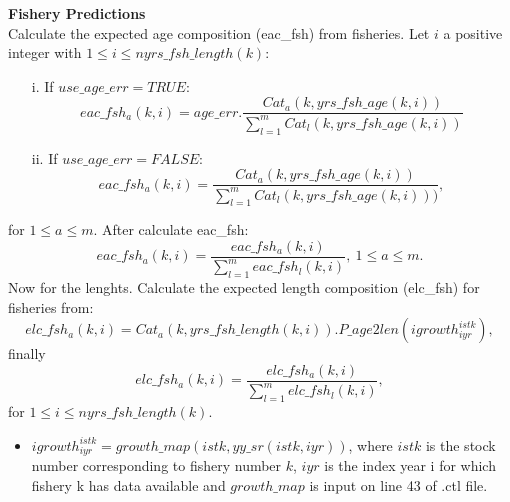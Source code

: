 \documentclass{article}
\begin{document}
\textbf{Fishery Predictions}\\
Calculate the expected age composition (eac\_fsh) from fisheries. Let $i$ a positive integer with $1\leq i \leq nyrs\_fsh\_length(k)$:
\begin{itemize}
\item [i.] If $use\_age\_err=TRUE$:
    \begin{equation}
    eac\_fsh_a(k,i)=age\_err.\dfrac{Cat_a(k,yrs\_fsh\_age(k,i))}{\displaystyle\sum_{l=1}^mCat_l(k,yrs\_fsh\_age(k,i))}
\end{equation}
\item [ii.] If $use\_age\_err=FALSE$:
\begin{equation}
    eac\_fsh_a(k,i)=\dfrac{Cat_a(k,yrs\_fsh\_age(k,i))}{\displaystyle\sum_{l=1}^mCat_l(k,yrs\_fsh\_age(k,i)))},
\end{equation}
\end{itemize}
for $1\leq a \leq m$.
After calculate eac\_fsh:
\begin{equation}
    eac\_fsh_a(k,i)=\dfrac{eac\_fsh_a(k,i)}{\displaystyle\sum_{l=1}^meac\_fsh_l(k,i)}, \ 1\leq a \leq m.
\end{equation}
Now for the lenghts. Calculate the expected length composition (elc\_fsh) for fisheries from: 
\begin{equation}
elc\_fsh_a(k,i)=Cat_a(k,yrs\_fsh\_length(k,i)).P\_age2len(igrowth^{istk}_{iyr}),
\end{equation}
finally
\begin{equation}
elc\_fsh_a(k,i)=\dfrac{elc\_fsh_a(k,i)}{\displaystyle\sum_{l=1}^melc\_fsh_l(k,i)},
\end{equation}
for $1\leq i \leq nyrs\_fsh\_length(k)$.\\
\begin{itemize}
    \item $igrowth^{istk}_{iyr}=growth\_map(istk,yy\_sr(istk,iyr))$, where $istk$ is the stock number corresponding to fishery number $k$, $iyr$ is the index year i for which fishery k has data available and $growth\_map$ is input on line 43 of .ctl file.
\end{itemize}
\end{document}
